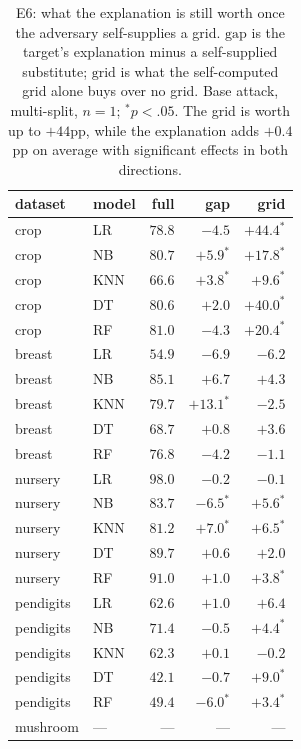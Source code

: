 \documentclass[sigconf,anonymous,review]{acmart}
\begin{document}
\begin{table}[t]
\centering
\caption{E6: what the explanation is still worth once the adversary self-supplies a grid.
$\text{gap}$ is the target's explanation minus a self-supplied substitute; $\text{grid}$ is what the
self-computed grid alone buys over no grid. Base attack, multi-split, $n{=}1$; $^{*}p{<}.05$.
The grid is worth up to $+44$pp, while the explanation adds $+0.4$pp on average with significant
effects in both directions.}
\label{tab:noexpl}
\begin{tabular}{llrrr}
\toprule
dataset & model & full & gap & grid \\
\midrule
crop      & LR  & $78.8$ & $-4.5$      & $+44.4^{*}$ \\
crop      & NB  & $80.7$ & $+5.9^{*}$  & $+17.8^{*}$ \\
crop      & KNN & $66.6$ & $+3.8^{*}$  & $+9.6^{*}$ \\
crop      & DT  & $80.6$ & $+2.0$      & $+40.0^{*}$ \\
crop      & RF  & $81.0$ & $-4.3$      & $+20.4^{*}$ \\
breast    & LR  & $54.9$ & $-6.9$      & $-6.2$ \\
breast    & NB  & $85.1$ & $+6.7$      & $+4.3$ \\
breast    & KNN & $79.7$ & $+13.1^{*}$ & $-2.5$ \\
breast    & DT  & $68.7$ & $+0.8$      & $+3.6$ \\
breast    & RF  & $76.8$ & $-4.2$      & $-1.1$ \\
nursery   & LR  & $98.0$ & $-0.2$      & $-0.1$ \\
nursery   & NB  & $83.7$ & $-6.5^{*}$  & $+5.6^{*}$ \\
nursery   & KNN & $81.2$ & $+7.0^{*}$  & $+6.5^{*}$ \\
nursery   & DT  & $89.7$ & $+0.6$      & $+2.0$ \\
nursery   & RF  & $91.0$ & $+1.0$      & $+3.8^{*}$ \\
pendigits & LR  & $62.6$ & $+1.0$      & $+6.4$ \\
pendigits & NB  & $71.4$ & $-0.5$      & $+4.4^{*}$ \\
pendigits & KNN & $62.3$ & $+0.1$      & $-0.2$ \\
pendigits & DT  & $42.1$ & $-0.7$      & $+9.0^{*}$ \\
pendigits & RF  & $49.4$ & $-6.0^{*}$  & $+3.4^{*}$ \\
mushroom  & --- & ---    & ---         & --- \\
\bottomrule
\end{tabular}
\end{table}
\end{document}
